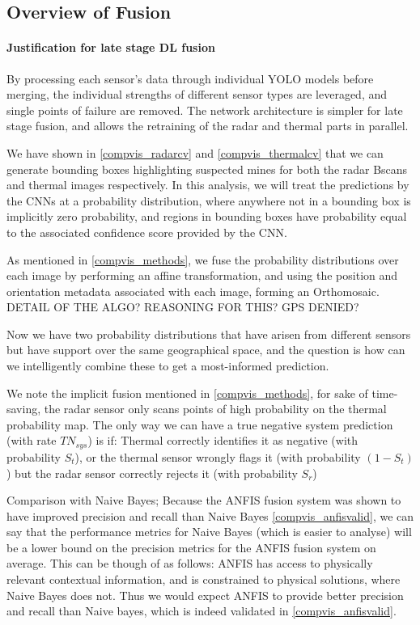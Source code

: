 \subsection{Overview of Fusion} \label{fusion_overview}


\paragraph{Justification for late stage DL fusion} By processing each sensor's data through individual YOLO models before merging, the individual strengths of different sensor types are leveraged, and single points of failure are removed. The network architecture is simpler for late stage fusion, and allows the retraining of the radar and thermal parts in parallel. 


    We have shown in \ref{compvis_radarcv} and \ref{compvis_thermalcv} that we can generate bounding boxes highlighting suspected mines for both the radar Bscans and thermal images respectively. In this analysis, we will treat the predictions by the CNNs at a probability distribution, where anywhere not in a bounding box is implicitly zero probability, and regions in bounding boxes have probability equal to the associated confidence score provided by the CNN.
    
    As mentioned in \ref{compvis_methods}, we fuse the probability distributions over each image by performing an affine transformation, and using the position and orientation metadata associated with each image, forming an Orthomosaic. DETAIL OF THE ALGO? REASONING FOR THIS? GPS DENIED? 
    
    Now we have two probability distributions that have arisen from different sensors but have support over the same geographical space, and the question is how can we intelligently combine these to get a most-informed prediction.
    
    
    We note the implicit fusion mentioned in \ref{compvis_methods}, for sake of time-saving, the radar sensor only scans points of high probability on the thermal probability map. The only way we can have a true negative system prediction (with rate $TN_{sys}$) is if: Thermal correctly identifies it as negative (with probability $S_t$), or the thermal sensor wrongly flags it (with probability $(1-S_t)$) but the radar sensor correctly rejects it (with probability $S_r$)
    
    Comparison with Naive Bayes; Because the ANFIS fusion system was shown to have improved precision and recall than Naive Bayes \ref{compvis_anfisvalid}, we can say that the performance metrics for Naive Bayes (which is easier to analyse) will be a lower bound on the precision metrics for the ANFIS fusion system on average. This can be though of as follows: ANFIS has access to physically relevant contextual information, and is constrained to physical solutions, where Naive Bayes does not. Thus we would expect ANFIS to provide better precision and recall than Naive bayes, which is indeed validated in \ref{compvis_anfisvalid}.

